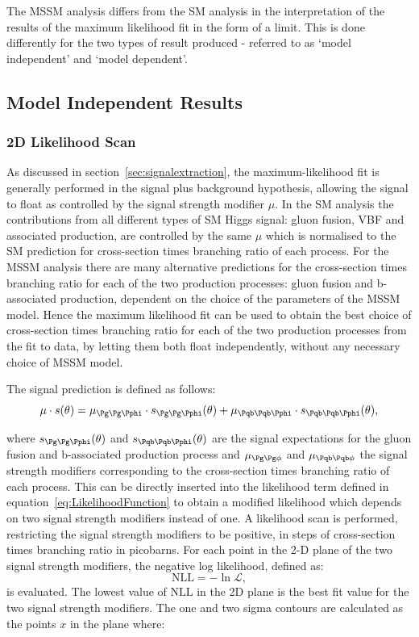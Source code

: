 The \ac{MSSM} analysis differs from the \ac{SM} analysis in the
interpretation of the results of the maximum likelihood fit in the form of a limit. This
is done differently for the two types of result produced - referred to as `model 
independent' and `model dependent'. 

\subsection{Model Independent Results}
\label{sec:modelindependent}

\subsubsection{2D Likelihood Scan}

As discussed in section~\ref{sec:signalextraction}, the maximum-likelihood fit
is generally performed in the signal plus background hypothesis, allowing the
signal to float as controlled by the signal strength modifier $\mu$. In the
\ac{SM} analysis the contributions from all different types of \ac{SM} Higgs
signal: gluon fusion, \ac{VBF} and associated production, are controlled by the
same $\mu$ which is normalised to the \ac{SM} prediction for cross-section times
branching ratio of each process. For the \ac{MSSM}
analysis there are many alternative predictions for the cross-section times
branching ratio for each of the two production processes: gluon fusion and
b-associated production, dependent on the choice of the parameters of the
\ac{MSSM} model. Hence the maximum likelihood fit can be used to obtain the best
choice of cross-section times branching ratio for each of the two production
processes from the fit to data, by letting them both float independently,
without any necessary choice of \ac{MSSM} model.

The signal prediction is defined as follows:
\begin{equation}
\mu \cdot s(\theta) = \mu_{\Pg\Pg\Pphi} \cdot s_{\Pg\Pg\Pphi}(\theta) + \mu_{\Pqb\Pqb\Pphi}
\cdot s_{\Pqb\Pqb\Pphi}(\theta) ,
\end{equation}

where $s_{\Pg\Pg\Pphi}(\theta)$ and $s_{\Pqb\Pqb\Pphi}(\theta)$ are the signal expectations for the gluon
fusion and b-associated production process and $\mu_{\Pg\Pg\phi}$ and
$\mu_{\Pqb\Pqb\phi}$
the signal strength modifiers corresponding to the cross-section times branching
ratio of each process. This can be directly inserted into the likelihood
term defined in equation~\ref{eq:LikelihoodFunction} to obtain a modified
likelihood which depends on two signal strength modifiers instead of one. A
likelihood scan is performed, restricting the signal strength modifiers to
be positive, in steps of cross-section times branching ratio in picobarns. For
each point in the 2-D plane of the two signal strength modifiers, the negative
log likelihood, defined as:
\begin{equation}
\mathrm{NLL} = - \ln \mathcal{L} ,  
\end{equation}
is evaluated. The lowest value of $\mathrm{NLL}$ in the 2D plane is the best fit value
for the two signal strength modifiers. The one and two sigma contours are
calculated as the points $x$ in the plane where:


